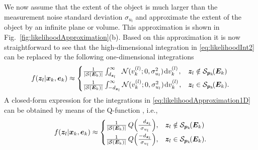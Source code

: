 \documentclass[11pt,a4paper]{article}
\newcommand{\ist}{\hspace*{.3mm}}
\newcommand{\rmv}{\hspace*{-.3mm}}
\newcommand{\nn}{\nonumber}
\begin{document}
We now assume that the extent of the object is much larger than the measurement noise standard deviation  $\sigma_{u_{l}}$ and approximate the extent of the object by an infinite plane or volume. This approximation is shown in Fig.~\ref{fig:likelihoodApproximation}(b). Based on this approximation it is now straightforward to see that the high-dimensional integration in \eqref{eq:likelihoodInt2} can be replaced by the following one-dimensional\vspace{1mm} integrations
\begin{align}
 &f(\V{z}_{l} | \V{x}_{k}, \V{e}_{k}) \approx  \begin{cases}
   \frac{1}{| \Set{S}(\M{E}_{k}) |}  \int_{d_{\V{z}_l}}^{\infty} \hspace{2mm} \mathcal{N}(v^{(l)}_{k};0,\sigma^2_{u_{l}}) \ist \mathrm{d} v^{(l)}_k  \ist, &  \V{z}_l \notin \Set{S}_{\V{p}_{k}}\rmv\rmv(\M{E}_{k}) \\[1.5mm]
    \frac{1}{| \Set{S}(\M{E}_{k}) |}  \int^{\infty}_{-d_{\V{z}_l}}  \mathcal{N}(v^{(l)}_{k};0,\sigma^2_{u_{l}} ) \ist \mathrm{d} v^{(l)}_k   \ist, & \V{z}_l \in \Set{S}_{\V{p}_{k}}\rmv\rmv(\M{E}_{k})  . 
   \end{cases} \label{eq:likelihoodApproximation1D} \\[-6mm]
   \nn
\end{align}
A closed-form expression for the integrations in \eqref{eq:likelihoodApproximation1D} can be obtained by means of the Q-function \cite{BorSun:J79}, i.e.,
\begin{align}
 &f(\V{z}_{l} | \V{x}_{k}, \V{e}_{k}) \approx  \begin{cases}
   \frac{1}{| \Set{S}(\M{E}_{k}) |} \ist\ist Q\Big(\frac{\phantom{-}d_{\V{z}_l}}{\sigma_{u_{l}}}\Big), &  \V{z}_l \notin \Set{S}_{\V{p}_{k}}\rmv\rmv(\M{E}_{k}) \\[1.5mm]
    \frac{1}{| \Set{S}(\M{E}_{k}) |} \ist\ist  Q\Big(\frac{-d_{\V{z}_l}}{\sigma_{u_{l}}}\Big), & \V{z}_l \in \Set{S}_{\V{p}_{k}}\rmv\rmv(\M{E}_{k}) . 
   \end{cases} \label{eq:likelihoodApproximation1DQ} \\[-6.5mm]
   \nn
\end{align}
\end{document}
